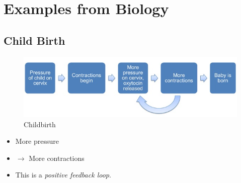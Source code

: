 \section{Examples from Biology}
\label{sec:examples}
\subsection{Child Birth}
\label{subsec:examples-pregnancy}
\begin{frame}{\insertsubsection}
    \begin{figure}
        \includegraphics[width=\textwidth]{media/Childbirth.jpg}
        \caption{Childbirth~\cite{albert2022}}
    \end{figure}
    \begin{itemize}[<+->]
        \item More pressure 
        \item[ ] $\rightarrow$ More contractions
        \item This is a \emph{positive feedback loop}.
    \end{itemize}
\end{frame}
%
%
